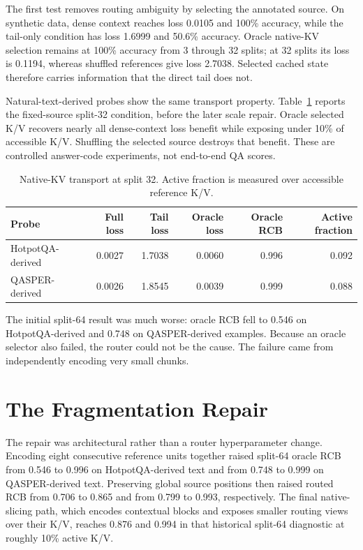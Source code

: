 \documentclass[11pt]{article}
\begin{document}
The first test removes routing ambiguity by selecting the annotated source. On synthetic
data, dense context reaches loss 0.0105 and 100\% accuracy, while the tail-only condition
has loss 1.6999 and 50.6\% accuracy. Oracle native-KV selection remains at 100\% accuracy
from 3 through 32 splits; at 32 splits its loss is 0.1194, whereas shuffled references
give loss 2.7038. Selected cached state therefore carries information that the direct tail
does not.

Natural-text-derived probes show the same transport property. Table~\ref{tab:transport}
reports the fixed-source split-32 condition, before the later scale repair. Oracle selected
K/V recovers nearly all dense-context loss benefit while exposing under 10\% of accessible
K/V. Shuffling the selected source destroys that benefit. These are controlled answer-code
experiments, not end-to-end QA scores.

\begin{table}[H]
\centering
\small
\caption{Native-KV transport at split 32. Active fraction is measured over accessible
reference K/V.}
\label{tab:transport}
\begin{tabular}{lrrrrr}
\toprule
Probe & Full loss & Tail loss & Oracle loss & Oracle RCB & Active fraction \\
\midrule
HotpotQA-derived & 0.0027 & 1.7038 & 0.0060 & 0.996 & 0.092 \\
QASPER-derived   & 0.0026 & 1.8545 & 0.0039 & 0.999 & 0.088 \\
\bottomrule
\end{tabular}
\end{table}

The initial split-64 result was much worse: oracle RCB fell to 0.546 on HotpotQA-derived
and 0.748 on QASPER-derived examples. Because an oracle selector also failed, the router
could not be the cause. The failure came from independently encoding very small chunks.

\section{The Fragmentation Repair}
\label{sec:fragmentation}

The repair was architectural rather than a router hyperparameter change. Encoding eight
consecutive reference units together raised split-64 oracle RCB from 0.546 to 0.996 on
HotpotQA-derived text and from 0.748 to 0.999 on QASPER-derived text. Preserving global
source positions then raised routed RCB from 0.706 to 0.865 and from 0.799 to 0.993,
respectively. The final native-slicing path, which encodes contextual blocks and exposes
smaller routing views over their K/V, reaches 0.876 and 0.994 in that historical split-64
diagnostic at roughly 10\% active K/V.
\end{document}
